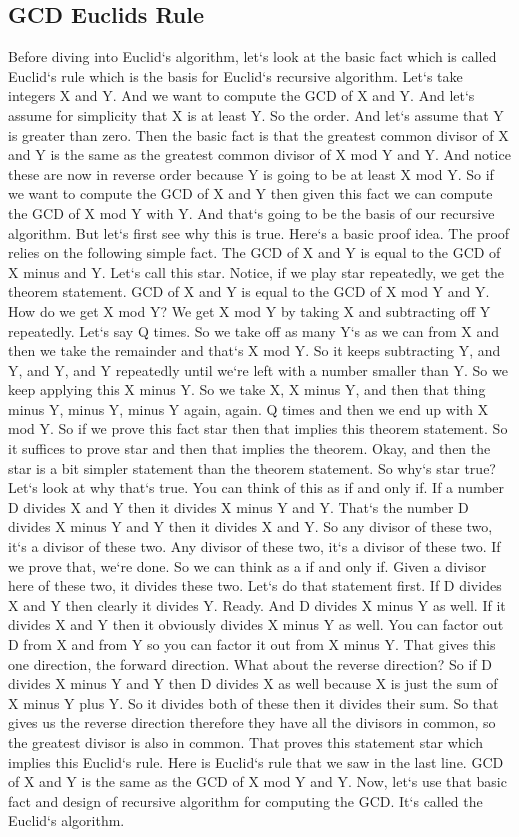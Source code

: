 \subsection{GCD  Euclids Rule}
Before diving into Euclid`s algorithm, let`s look at the basic fact which is called Euclid`s rule which is the basis for Euclid`s recursive algorithm.
Let`s take integers X and Y\@.
And we want to compute the GCD of X and Y\@.
And let`s assume for simplicity that X is at least Y\@.
So the order.
And let`s assume that Y is greater than zero.
Then the basic fact is that the greatest common divisor of X and Y is the same as the greatest common divisor of X mod Y and Y\@.
And notice these are now in reverse order because Y is going to be at least X mod Y\@.
So if we want to compute the GCD of X and Y then given this fact we can compute the GCD of X mod Y with Y\@.
And that`s going to be the basis of our recursive algorithm.
But let`s first see why this is true.
Here`s a basic proof idea.
The proof relies on the following simple fact.
The GCD of X and Y is equal to the GCD of X minus and Y\@.
Let`s call this star.
Notice, if we play star repeatedly, we get the theorem statement.
GCD of X and Y is equal to the GCD of X mod Y and Y\@.
How do we get X mod Y? We get X mod Y by taking X and subtracting off Y repeatedly.
Let`s say Q times.
So we take off as many Y`s as we can from X and then we take the remainder and that`s X mod Y\@.
So it keeps subtracting Y, and Y, and Y, and Y repeatedly until we`re left with a number smaller than Y\@.
So we keep applying this X minus Y\@.
So we take X, X minus Y, and then that thing minus Y, minus Y, minus Y again, again.
Q times and then we end up with X mod Y\@.
So if we prove this fact star then that implies this theorem statement.
So it suffices to prove star and then that implies the theorem.
Okay, and then the star is a bit simpler statement than the theorem statement.
So why`s star true? Let`s look at why that`s true.
You can think of this as if and only if.
If a number D divides X and Y then it divides X minus Y and Y\@.
That`s the number D divides X minus Y and Y then it divides X and Y\@.
So any divisor of these two, it`s a divisor of these two.
Any divisor of these two, it`s a divisor of these two.
If we prove that, we`re done.
So we can think as a if and only if.
Given a divisor here of these two, it divides these two.
Let`s do that statement first.
If D divides X and Y then clearly it divides Y\@.
Ready.
And D divides X minus Y as well.
If it divides X and Y then it obviously divides X minus Y as well.
You can factor out D from X and from Y so you can factor it out from X minus Y\@.
That gives this one direction, the forward direction.
What about the reverse direction? So if D divides X minus Y and Y then D divides X as well because X is just the sum of X minus Y plus Y\@.
So it divides both of these then it divides their sum.
So that gives us the reverse direction therefore they have all the divisors in common, so the greatest divisor is also in common.
That proves this statement star which implies this Euclid`s rule.
Here is Euclid`s rule that we saw in the last line.
GCD of X and Y is the same as the GCD of X mod Y and Y\@.
Now, let`s use that basic fact and design of recursive algorithm for computing the GCD\@.
It`s called the Euclid`s algorithm.

